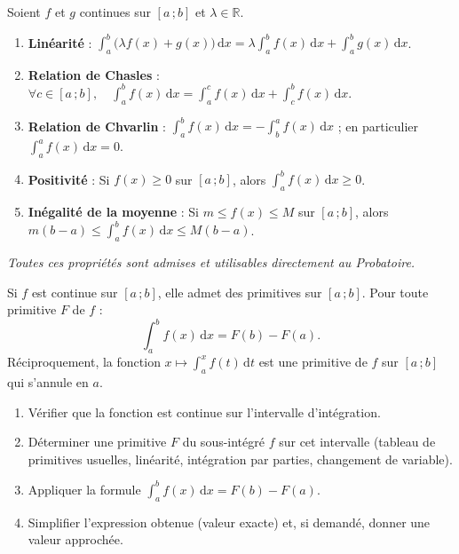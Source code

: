 \documentclass[11pt]{article}
\begin{document}
\begin{propriete}
Soient $f$ et $g$ continues sur $[a\,;b]$ et $\lambda \in \mathbb{R}$.
\begin{enumerate}
\item \textbf{Linéarité} : $\displaystyle\int_a^b \big(\lambda f(x)+g(x)\big)\,\mathrm{d}x = \lambda\int_a^b f(x)\,\mathrm{d}x + \int_a^b g(x)\,\mathrm{d}x$.
\item \textbf{Relation de Chasles} : $\forall c\in[a\,;b],\quad \int_a^b f(x)\,\mathrm{d}x = \int_a^c f(x)\,\mathrm{d}x + \int_c^b f(x)\,\mathrm{d}x$.
\item \textbf{Relation de Chvarlin} : $\displaystyle\int_a^b f(x)\,\mathrm{d}x = -\int_b^a f(x)\,\mathrm{d}x$ ; en particulier $\int_a^a f(x)\,\mathrm{d}x = 0$.
\item \textbf{Positivité} : Si $f(x)\geq 0$ sur $[a\,;b]$, alors $\int_a^b f(x)\,\mathrm{d}x \geq 0$.
\item \textbf{Inégalité de la moyenne} : Si $m \leq f(x) \leq M$ sur $[a\,;b]$, alors $m(b-a) \leq \int_a^b f(x)\,\mathrm{d}x \leq M(b-a)$.
\end{enumerate}
\emph{Toutes ces propriétés sont admises et utilisables directement au Probatoire.}
\end{propriete}

\begin{aretenir}
Si $f$ est continue sur $[a\,;b]$, elle admet des primitives sur $[a\,;b]$. Pour toute primitive $F$ de $f$ :
\[
\int_a^b f(x)\,\mathrm{d}x = F(b)-F(a).
\]
Réciproquement, la fonction $x \mapsto \int_a^x f(t)\,\mathrm{d}t$ est une primitive de $f$ sur $[a\,;b]$ qui s'annule en $a$.
\end{aretenir}

\begin{methode}
\begin{enumerate}
\item Vérifier que la fonction est continue sur l'intervalle d'intégration.
\item Déterminer une primitive $F$ du sous-intégré $f$ sur cet intervalle (tableau de primitives usuelles, linéarité, intégration par parties, changement de variable).
\item Appliquer la formule $\int_a^b f(x)\,\mathrm{d}x = F(b)-F(a)$.
\item Simplifier l'expression obtenue (valeur exacte) et, si demandé, donner une valeur approchée.
\end{enumerate}
\end{methode}
\end{document}
